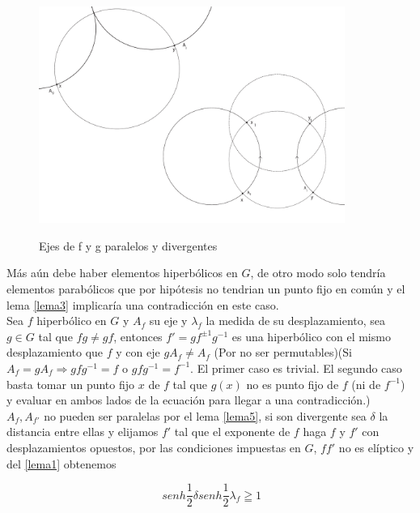 \begin{figure}[h]
  \centering
  \includegraphics[width=10cm]{lemma6-dibujo-1-2}\\
  \caption{Ejes de f y g paralelos y divergentes}\label{lemma6-dibujo-1-2}
\end{figure}



M\'as a\'un debe haber elementos hiperb\'olicos en $G$, de otro modo
solo tendr\'ia elementos parab\'olicos que por hip\'otesis no
tendrian un punto fijo en com\'un y el lema \ref{lema3} implicar\'ia
una contradicci\'on en este caso. \\

Sea $f$ hiperb\'olico en $G$ y $A_{f} $ su eje y $\lambda_{f}$ la
medida de su desplazamiento, sea $g \in G$ tal que $fg \neq gf$,
entonces $f' = gf^{\pm 1}g^{-1}$ es una hiperb\'olico con el mismo
desplazamiento que $f$ y con eje $gA_{f} \neq A_{f}$ (Por no ser
permutables)(Si $A_{f}=gA_{f} \Rightarrow gfg^{-1}=f$ o
$gfg^{-1}=f^{-1}$. El primer caso es trivial. El segundo caso basta tomar un punto fijo $x$ de $f$ tal que  $g(x)$ no es punto fijo de $f$ (ni de $f^{-1}$) y evaluar en ambos lados de la ecuaci\'on para llegar a una contradicci\'on.) \\

$A_{f},A_{f'}$ no pueden ser paralelas por el lema \ref{lema5}, si
son divergente sea $\delta$ la distancia entre ellas y elijamos $f'$
tal que el exponente de $f$ haga $f$ y $f'$ con desplazamientos
opuestos, por las condiciones impuestas en $G$, $ff'$ no es
el\'iptico y del \ref{lema1} obtenemos

\begin{equation} \label{relacionseno1}
 \  senh \frac{1}{2}
\delta senh \frac{1}{2} \lambda_{f} \geqq 1
\end{equation}

